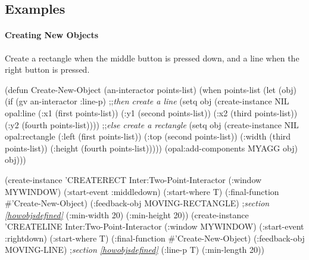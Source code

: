 \begin{group}
\subsection{Examples}

\paragraph{Creating New Objects}
Create a rectangle when the middle button is pressed down, and a line when
the right button is pressed.
\begin{programexample}
(defun Create-New-Object (an-interactor points-list)
  (when points-list
    (let (obj)
      (if (gv an-interactor :line-p)
	  ;;{\it then create a line}
	  (setq obj (create-instance NIL opal:line
                       (:x1 (first points-list))
                       (:y1 (second points-list))
                       (:x2 (third points-list))
                       (:y2 (fourth points-list))))
	  ;;{\it else create a rectangle}
	  (setq obj (create-instance NIL opal:rectangle
                       (:left (first points-list))
                       (:top (second points-list))
                       (:width (third points-list))
                       (:height (fourth points-list)))))
      (opal:add-components MYAGG obj)
      obj)))

(create-instance 'CREATERECT Inter:Two-Point-Interactor
   (:window MYWINDOW)
   (:start-event :middledown)
   (:start-where T)
   (:final-function \#'Create-New-Object)
   (:feedback-obj MOVING-RECTANGLE) ;{\it section \ref{howobjsdefined}}
   (:min-width 20)
   (:min-height 20))
(create-instance 'CREATELINE Inter:Two-Point-Interactor
   (:window MYWINDOW)
   (:start-event :rightdown)
   (:start-where T)
   (:final-function \#'Create-New-Object)
   (:feedback-obj MOVING-LINE) ;{\it section \ref{howobjsdefined}}
   (:line-p T)
   (:min-length 20))
\end{programexample}
\end{group}



